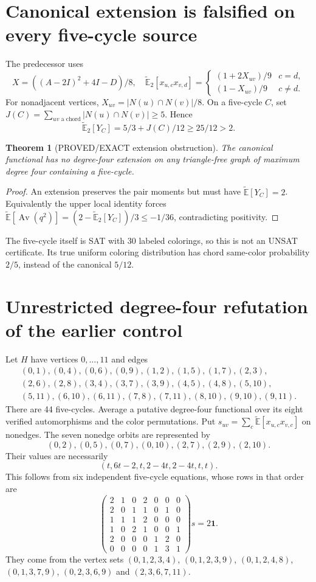 \documentclass[11pt]{article}
\newtheorem{theorem}{Theorem}
\newcommand{\E}{\widetilde{\mathbb E}}
\newcommand{\av}{\operatorname{Av}}
\begin{document}
\section{Canonical extension is falsified on every five-cycle source}
The predecessor uses
\[
 X=((A-2I)^2+4I-D)/8,
\quad \E_2[x_{u,c}x_{v,d}]=
\begin{cases}(1+2X_{uv})/9&c=d,\\(1-X_{uv})/9&c\ne d.\end{cases}
\]
For nonadjacent vertices, $X_{uv}=|N(u)\cap N(v)|/8$. On a five-cycle $C$, set
$J(C)=\sum_{uv\text{ a chord}}|N(u)\cap N(v)|\ge5$. Hence
\[
 \E_2[Y_C]=5/3+J(C)/12\ge25/12>2.
\]
\begin{theorem}[PROVED/EXACT extension obstruction]
The canonical functional has no degree-four extension on any triangle-free graph of maximum degree four containing a five-cycle.
\end{theorem}
\begin{proof}
An extension preserves the pair moments but must have $\E[Y_C]=2$. Equivalently the upper local identity forces
$\E[\av(q^2)]=(2-\E_2[Y_C])/3\le-1/36$, contradicting positivity.
\end{proof}
The five-cycle itself is SAT with 30 labeled colorings, so this is not an UNSAT certificate. Its true uniform coloring distribution has chord same-color probability $2/5$, instead of the canonical $5/12$.

\section{Unrestricted degree-four refutation of the earlier control}
Let $H$ have vertices $0,\ldots,11$ and edges
\[
\begin{gathered}
(0,1),(0,4),(0,6),(0,9),(1,2),(1,5),(1,7),(2,3),\\
(2,6),(2,8),(3,4),(3,7),(3,9),(4,5),(4,8),(5,10),\\
(5,11),(6,10),(6,11),(7,8),(7,11),(8,10),(9,10),(9,11).
\end{gathered}
\]
There are 44 five-cycles. Average a putative degree-four functional over its eight verified automorphisms and the color permutations. Put $s_{uv}=\sum_c\E[x_{u,c}x_{v,c}]$ on nonedges. The seven nonedge orbits are represented by
\[
(0,2),(0,5),(0,7),(0,10),(2,7),(2,9),(2,10).
\]
Their values are necessarily
\[
(t,6t-2,t,2-4t,2-4t,t,t).
\]
This follows from six independent five-cycle equations, whose rows in that order are
\[
\begin{pmatrix}
2&1&0&2&0&0&0\\2&0&1&1&0&1&0\\1&1&1&2&0&0&0\\
1&0&2&1&0&0&1\\2&0&0&0&1&2&0\\0&0&0&0&1&3&1
\end{pmatrix}s=2\mathbf1.
\]
They come from the vertex sets $(0,1,2,3,4)$, $(0,1,2,3,9)$, $(0,1,2,4,8)$, $(0,1,3,7,9)$, $(0,2,3,6,9)$ and $(2,3,6,7,11)$.
\end{document}
